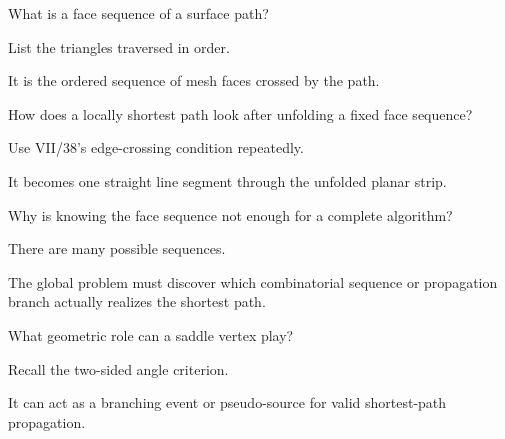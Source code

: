 \begin{exercise}\label{exr:vii39-14}
What is a face sequence of a surface path?
\end{exercise}

\begin{hint}
List the triangles traversed in order.
\end{hint}

\begin{solution}
It is the ordered sequence of mesh faces crossed by the path.
\end{solution}

\begin{exercise}\label{exr:vii39-15}
How does a locally shortest path look after unfolding a fixed face sequence?
\end{exercise}

\begin{hint}
Use VII/38's edge-crossing condition repeatedly.
\end{hint}

\begin{solution}
It becomes one straight line segment through the unfolded planar strip.
\end{solution}

\begin{exercise}\label{exr:vii39-16}
Why is knowing the face sequence not enough for a complete algorithm?
\end{exercise}

\begin{hint}
There are many possible sequences.
\end{hint}

\begin{solution}
The global problem must discover which combinatorial sequence or propagation branch actually realizes the shortest path.
\end{solution}

\begin{exercise}\label{exr:vii39-17}
What geometric role can a saddle vertex play?
\end{exercise}

\begin{hint}
Recall the two-sided angle criterion.
\end{hint}

\begin{solution}
It can act as a branching event or pseudo-source for valid shortest-path propagation.
\end{solution}

